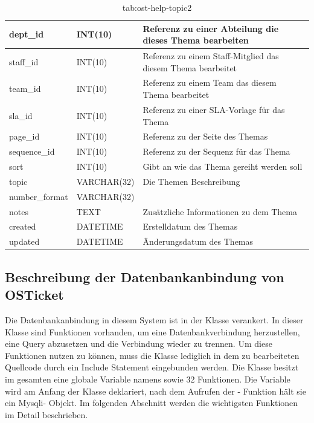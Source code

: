 		\begin{table}[h]
			\begin{tabular}{|p{3.5cm}|p{4cm}|p{6.2cm}|}
		\hline
		dept\_id & INT(10) & Referenz zu einer Abteilung die dieses Thema bearbeiten\\
		\hline
		staff\_id & INT(10) & Referenz zu einem Staff-Mitglied das diesem Thema bearbeitet\\
		\hline
		team\_id & INT(10) & Referenz zu einem Team das diesem Thema bearbeitet\\
		\hline
		sla\_id & INT(10) & Referenz zu einer SLA-Vorlage für das Thema\\
		\hline
		page\_id & INT(10) & Referenz zu der Seite des Themas\\
		\hline
		sequence\_id & INT(10) & Referenz zu der Sequenz für das Thema\\
		\hline
		sort & INT(10) & Gibt an wie das Thema gereiht werden soll\\
		\hline
		topic & VARCHAR(32) & Die Themen Beschreibung\\
		\hline
		number\_format & VARCHAR(32) & \\
		\hline
		notes & TEXT & Zusätzliche Informationen zu dem Thema\\
		\hline
		created & DATETIME & Erstelldatum des Themas\\
		\hline
		updated & DATETIME & Änderungsdatum des Themas\\
		\hline
		
	\end{tabular}
	\caption{tab:ost-help-topic2}
\end{table}
\label{tab:ost_help_topic2}

\newpage


\subsection{Beschreibung der Datenbankanbindung von OSTicket}
Die Datenbankanbindung in diesem System ist in der Klasse  verankert. In dieser Klasse sind Funktionen vorhanden, um eine Datenbankverbindung herzustellen, eine Query abzusetzen und die Verbindung wieder zu trennen.
Um diese Funktionen nutzen zu können, muss die Klasse  lediglich in dem zu bearbeiteten Quellcode durch ein Include Statement eingebunden werden.
Die Klasse besitzt im gesamten eine globale Variable namens  sowie 32 Funktionen. Die Variable wird am Anfang der Klasse deklariert, nach dem Aufrufen der - Funktion hält sie ein Mysqli- Objekt.
Im folgenden Abschnitt werden die wichtigsten Funktionen im Detail beschrieben.


